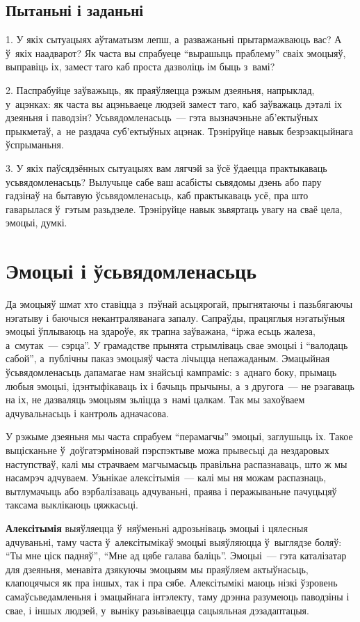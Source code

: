 \subsection*{Пытаньні і заданьні}

1. У якіх сытуацыях аўтаматызм лепш, а~разважаньні прытармажваюць вас? А ў~якіх наадварот? Як часта вы спрабуеце ``вырашыць праблему'' сваіх эмоцыяў, выправіць іх, замест таго каб проста дазволіць ім быць з~вамі?

2. Паспрабуйце заўважыць, як праяўляецца рэжым дзеяньня, напрыклад, у~ацэнках: як часта вы ацэньваеце людзей замест таго, каб заўважаць дэталі іх дзеяньня і паводзін? Усьвядомленасьць~--- гэта вызначэньне аб'ектыўных прыкметаў, а~не раздача суб'ектыўных ацэнак. Трэніруйце навык безрэакцыйнага ўспрыманьня.

3. У якіх паўсядзённых сытуацыях вам лягчэй за ўсё ўдаецца практыкаваць усьвядомленасьць? Вылучыце сабе ваш асабісты сьвядомы дзень або пару гадзінаў на бытавую ўсьвядомленасьць, каб практыкаваць усё, пра што гаварылася ў~гэтым разьдзеле. Трэніруйце навык зьвяртаць увагу на сваё цела, эмоцыі, думкі.


\section{Эмоцыі і ўсьвядомленасьць}

Да эмоцыяў шмат хто ставіцца з~пэўнай асьцярогай, прыгнятаючы і пазьбягаючы нэгатыву і баючыся некантраляванага запалу. Сапраўды, працяглыя нэгатыўныя эмоцыі ўплываюць на здароўе, як трапна заўважана, ``іржа есьць жалеза, а~смутак~--- сэрца''. У грамадстве прынята стрымліваць свае эмоцыі і ``валодаць сабой'', а~публічны паказ эмоцыяў часта лічыцца непажаданым. Эмацыйная ўсьвядомленасьць дапамагае нам знайсьці кампраміс: з~аднаго боку, прымаць любыя эмоцыі, ідэнтыфікаваць іх і бачыць прычыны, а~з другога~--- не рэагаваць на іх, не дазваляць эмоцыям зьліцца з~намі цалкам. Так мы захоўваем адчувальнасьць і кантроль адначасова.

У рэжыме дзеяньня мы часта спрабуем ``перамагчы'' эмоцыі, заглушыць іх. Такое выцісканьне ў~доўгатэрміновай пэрспэктыве можа прывесьці да нездаровых наступстваў, калі мы страчваем магчымасьць правільна распазнаваць, што ж мы насамрэч адчуваем. Узьнікае алексітымія~--- калі мы ня можам распазнаць, вытлумачыць або вэрбалізаваць адчуваньні, праява і перажываньне пачуцьцяў таксама выклікаюць цяжкасьці.

\textbf{Алексітымія} выяўляецца ў~няўменьні адрозьніваць эмоцыі і цялесныя адчуваньні, таму часта ў~алексітымікаў эмоцыі выяўляюцца ў~выглядзе боляў: ``Ты мне ціск падняў'', ``Мне ад цябе галава баліць''. Эмоцыі~--- гэта каталізатар для дзеяньня, менавіта дзякуючы эмоцыям мы праяўляем актыўнасьць, клапоцячыся як пра іншых, так і пра сябе. Алексітымікі маюць нізкі ўзровень самаўсьведамленьня і эмацыйнага інтэлекту, таму дрэнна разумеюць паводзіны і свае, і іншых людзей, у~выніку разьвіваецца сацыяльная дэзадаптацыя.

